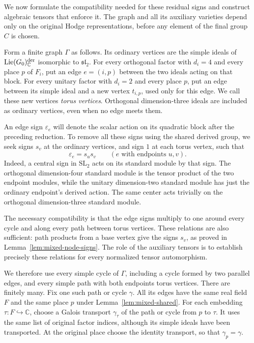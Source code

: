 \documentclass[11pt]{article}
\numberwithin{equation}{section}
\theoremstyle{definition}
\theoremstyle{remark}
\newcommand{\C}{\mathbb C}
\begin{document}
We now formulate the compatibility needed for these residual signs and
construct algebraic tensors that enforce it.  The graph and all its
auxiliary varieties depend only on the original Hodge representations,
before any element of the final group $C$ is chosen.

Form a finite graph $\Gamma$ as follows.  Its ordinary vertices are
the simple ideals of $\operatorname{Lie}(G_0)^{\rm der}_{\C}$
isomorphic to $\mathfrak{sl}_2$.  For every orthogonal factor with
$d_i=4$ and every place $p$ of $F_i$, put an edge $e=(i,p)$ between
the two ideals acting on that block.  For every unitary factor with
$d_i=2$ and every place $p$, put an edge between its simple ideal and
a new vertex $t_{i,p}$, used only for this edge.  We call these new
vertices \emph{torus vertices}.  Orthogonal dimension-three ideals
are included as ordinary vertices, even when no edge meets them.

An edge sign $\varepsilon_e$ will denote the scalar action on its
quadratic block after the preceding reduction.  To remove all these
signs using the shared derived group, we seek signs $s_v$ at the ordinary
vertices, and sign $1$ at each torus vertex, such that
\begin{equation}\label{eq:mixed-sign-target}
 \varepsilon_e=s_us_v
 \qquad(e\text{ with endpoints }u,v).
\end{equation}
Indeed, a central sign in $\mathrm{SL}_2$ acts on its standard module
by that sign.  The orthogonal dimension-four standard module is the
tensor product of the two endpoint modules, while the unitary
dimension-two standard module has just the ordinary endpoint's derived
action.  The same center acts trivially on the orthogonal
dimension-three standard module.

The necessary compatibility is that the edge signs multiply to one
around every cycle and along every path between torus vertices.
These relations are also sufficient: path products from a base vertex
give the signs $s_v$, as proved in Lemma~\ref{lem:mixed-node-signs}.
The role of the auxiliary tensors is to establish precisely these
relations for every normalized tensor automorphism.

We therefore use every simple cycle of $\Gamma$,
including a cycle formed by two parallel edges, and every simple path
with both endpoints torus vertices.  There are finitely many.  Fix one
such path or cycle $\gamma$.  All its edges have the same real field $F$ and
the same place $p$ under Lemma~\ref{lem:mixed-shared}.  For each
embedding $\tau:F\hookrightarrow\C$, choose a Galois transport
$\gamma_\tau$ of the path or cycle from $p$ to $\tau$.  It uses the
same list of original factor indices, although its simple ideals have
been transported.  At the original place choose the identity transport,
so that $\gamma_p=\gamma$.
\end{document}
